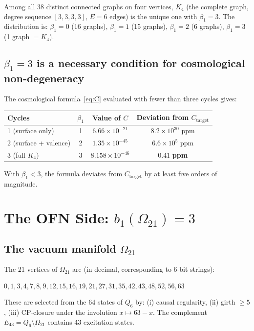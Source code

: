 \documentclass[11pt,a4paper]{article}
\begin{document}
\begin{result_box}[title={Script 1 --- Exhaustive enumeration}]
Among all 38 distinct connected graphs on four vertices, $K_4$ (the complete graph, degree sequence $[3,3,3,3]$, $E = 6$ edges) is the unique one with $\beta_1 = 3$. The distribution is: $\beta_1 = 0$ (16 graphs), $\beta_1 = 1$ (15 graphs), $\beta_1 = 2$ (6 graphs), $\beta_1 = 3$ (1 graph $= K_4$).
\end{result_box}

\subsection{\texorpdfstring{$\beta_1 = 3$}{beta1 = 3} is a necessary condition for cosmological non-degeneracy}

\begin{result_box}[title={Script 1 --- Degeneration test}]
The cosmological formula~\eqref{eq:C} evaluated with fewer than three cycles gives:
\begin{center}
\begin{tabular}{lccc}
\toprule
Cycles & $\beta_1$ & Value of $C$ & Deviation from $C_{\mathrm{target}}$ \\
\midrule
1 (surface only) & 1 & $6.66 \times 10^{-21}$ & $8.2 \times 10^{30}$ ppm \\
2 (surface + valence) & 2 & $1.35 \times 10^{-45}$ & $6.6 \times 10^{5}$ ppm \\
3 (full $K_4$) & 3 & $8.158 \times 10^{-46}$ & $\mathbf{0.41}$ \textbf{ppm} \\
\bottomrule
\end{tabular}
\end{center}
With $\beta_1 < 3$, the formula deviates from $C_{\mathrm{target}}$ by at least five orders of magnitude.
\end{result_box}

\section{The OFN Side: \texorpdfstring{$b_1(\Omega_{21}) = 3$}{b1(Omega21) = 3}}
\label{sec:ofn}

\subsection{The vacuum manifold \texorpdfstring{$\Omega_{21}$}{Omega21}}

The 21 vertices of $\Omega_{21}$ are (in decimal, corresponding to 6-bit strings):
\begin{center}
$0, 1, 3, 4, 7, 8, 9, 12, 15, 16, 19, 21, 27, 31, 35, 42, 43, 48, 52, 56, 63$
\end{center}
These are selected from the 64 states of $Q_6$ by: (i) causal regularity, (ii) girth $\geq 5$, (iii) CP-closure under the involution $x \mapsto 63 - x$. The complement $E_{43} = Q_6 \setminus \Omega_{21}$ contains 43 excitation states.
\end{document}
